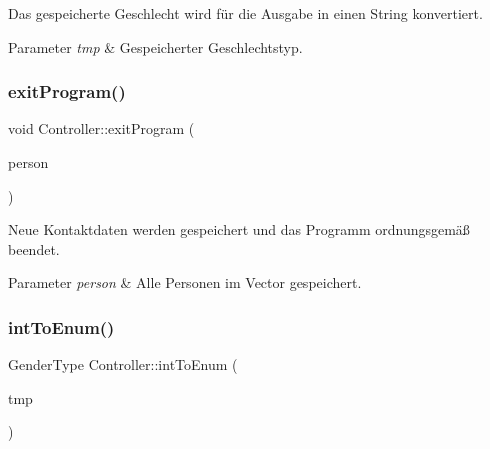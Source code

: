 Das gespeicherte Geschlecht wird für die Ausgabe in einen String konvertiert.


\begin{DoxyParams}{Parameter}
{\em tmp} & Gespeicherter Geschlechtstyp.\\
\hline
\end{DoxyParams}
\mbox{\label{classContactManager_1_1Controller_a5c039c4de9d2bb309b6c212c162b115c}} 
\subsubsection{\texorpdfstring{exit\+Program()}{exitProgram()}}
{\footnotesize\ttfamily void Controller\+::exit\+Program (\begin{DoxyParamCaption}\item[{vector$<$ \hyperlink{classContactManager_1_1Person}{Person} $>$ \&}]{person }\end{DoxyParamCaption})}



Neue Kontaktdaten werden gespeichert und das Programm ordnungsgemäß beendet.


\begin{DoxyParams}{Parameter}
{\em person} & Alle Personen im Vector gespeichert.\\
\hline
\end{DoxyParams}
\mbox{\label{classContactManager_1_1Controller_ac4295728664d4137e39478cd3e30e0fd}} 
\subsubsection{\texorpdfstring{int\+To\+Enum()}{intToEnum()}}
{\footnotesize\ttfamily Gender\+Type Controller\+::int\+To\+Enum (\begin{DoxyParamCaption}\item[{string}]{tmp }\end{DoxyParamCaption})\hspace{0.3cm}{\ttfamily [static]}}



